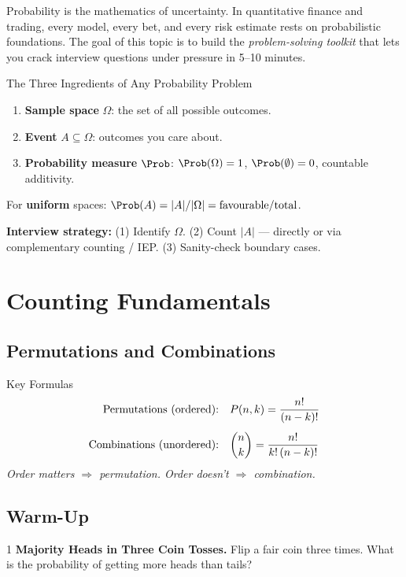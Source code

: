 \documentclass[11pt]{article}
\begin{document}
Probability is the mathematics of uncertainty. In quantitative finance and
trading, every model, every bet, and every risk estimate rests on
probabilistic foundations. The goal of this topic is to build the
\textit{problem-solving toolkit} that lets you crack interview questions
under pressure in 5--10 minutes.

\begin{conceptbox}{The Three Ingredients of Any Probability Problem}
\begin{enumerate}
  \item \textbf{Sample space} $\Omega$: the set of all possible outcomes.
  \item \textbf{Event} $A \subseteq \Omega$: outcomes you care about.
  \item \textbf{Probability measure} $\Prob$: $\Prob(\Omega)=1$, $\Prob(\emptyset)=0$, countable additivity.
\end{enumerate}
For \textbf{uniform} spaces:
$\Prob(A) = |A|/|\Omega| = \text{favourable}/\text{total}$.
\end{conceptbox}

\textbf{Interview strategy:} (1) Identify $\Omega$. (2) Count $|A|$ — directly or via
complementary counting / IEP. (3) Sanity-check boundary cases.

\section{Counting Fundamentals}

\subsection{Permutations and Combinations}

\begin{conceptbox}{Key Formulas}
\begin{align*}
  \text{Permutations (ordered):}\quad
    & P(n,k) = \frac{n!}{(n-k)!} \\[4pt]
  \text{Combinations (unordered):}\quad
    & \dbinom{n}{k} = \frac{n!}{k!\,(n-k)!}
\end{align*}
\textit{Order matters $\Rightarrow$ permutation. Order doesn't $\Rightarrow$ combination.}
\end{conceptbox}

\subsection{Warm-Up}

\begin{workedbox}{1}{\freelabel\quad{}}
\textbf{Majority Heads in Three Coin Tosses.}
Flip a fair coin three times. What is the probability of getting more heads than tails?
\end{workedbox}
\end{document}
